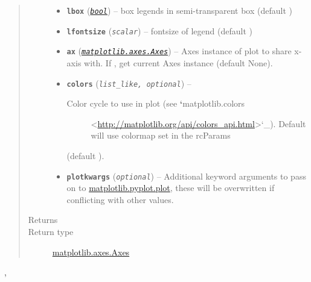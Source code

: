 \documentclass[letterpaper,10pt,english]{sphinxhowto}
\begin{document}
\begin{fulllineitems}
\begin{quote}
\begin{description}
\begin{itemize}
\item {} 
\textbf{\texttt{lbox}} (\href{https://docs.python.org/library/functions.html\#bool}{\emph{\texttt{bool}}}) -- box legends in semi-transparent box (default )

\item {} 
\textbf{\texttt{lfontsize}} (\emph{\texttt{scalar}}) -- fontsize of legend (default )

\item {} 
\textbf{\texttt{ax}} (\href{http://matplotlib.org/api/axes\_api.html\#matplotlib.axes.Axes}{\emph{\texttt{matplotlib.axes.Axes}}}) -- Axes instance of plot to share x-axis with. If , get
current Axes instance (default None).

\item {} 
\textbf{\texttt{colors}} (\emph{\texttt{list\_like, optional}}) -- \begin{description}
\item[{Color cycle to use in plot (see {\color{red}\bfseries{}{}`}matplotlib.colors}] \leavevmode
\textless{}\href{http://matplotlib.org/api/colors\_api.html}{http://matplotlib.org/api/colors\_api.html}\textgreater{}{}`\_). Default will use
colormap set in the rcParams

\end{description}

(default \code{{[}{]}}).


\item {} 
\textbf{\texttt{plotkwargs}} (\emph{\texttt{optional}}) -- Additional keyword arguments to pass on to
\href{http://matplotlib.org/api/pyplot\_api.html\#matplotlib.pyplot.plot}{matplotlib.pyplot.plot}, these will be overwritten if conflicting
with other values.

\end{itemize}

\item[{Returns}] \leavevmode


\item[{Return type}] \leavevmode
\href{http://matplotlib.org/api/axes\_api.html\#matplotlib.axes.Axes}{matplotlib.axes.Axes}

\end{description}\end{quote}




{\hyperref[swtools_doc:swtools.plot_basic]{\emph{}}}, {\hyperref[swtools_doc:swtools.plot_align]{\emph{}}}



\end{fulllineitems}
\end{document}
